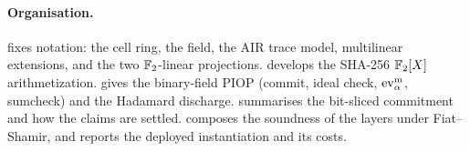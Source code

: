 \paragraph{Organisation.}
 fixes notation: the cell ring, the field, the AIR
trace model, multilinear extensions, and the two $\mathbb{F}_2$-linear
projections.
 develops the SHA-256 $\mathbb{F}_2[X]$ arithmetization.
 gives the binary-field PIOP (commit, ideal check,
$\operatorname{ev}^{\mathrm{m}}_{\alpha}$, sumcheck) and  the Hadamard discharge.
 summarises the bit-sliced commitment and how the
claims are settled.
 composes the soundness of the layers under
Fiat--Shamir, and  reports the deployed instantiation and
its costs.
